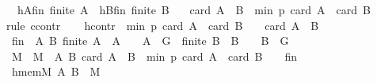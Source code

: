 \begin{isabellebody}
\ \ hAfin{\isacharcolon}{\kern0pt}\ {\isachardoublequoteopen}finite\ A{\isachardoublequoteclose}\ \ hBfin{\isacharcolon}{\kern0pt}\ {\isachardoublequoteopen}finite\ B{\isachardoublequoteclose}\isanewline
\ \ \ {\isachardoublequoteopen}card\ {\isacharparenleft}{\kern0pt}A\ {\isasymcdots}\ B{\isacharparenright}{\kern0pt}\ {\isasymge}\ min\ p\ {\isacharparenleft}{\kern0pt}card\ A\ {\isacharplus}{\kern0pt}\ card\ B\ {\isacharminus}{\kern0pt}\ {}{\isacharparenright}{\kern0pt}{\isachardoublequoteclose}\isanewline
%
\isadelimproof
%
\endisadelimproof
%
\isatagproof
{}\isamarkupfalse%
{\isacharparenleft}{\kern0pt}rule\ ccontr{\isacharparenright}{\kern0pt}\isanewline
\ \ \isamarkupfalse%
\ hcontr{\isacharcolon}{\kern0pt}\ {\isachardoublequoteopen}{\isasymnot}\ min\ p\ {\isacharparenleft}{\kern0pt}card\ A\ {\isacharplus}{\kern0pt}\ card\ B\ {\isacharminus}{\kern0pt}\ {}{\isacharparenright}{\kern0pt}\ {\isasymle}\ card\ {\isacharparenleft}{\kern0pt}A\ {\isasymcdots}\ B{\isacharparenright}{\kern0pt}{\isachardoublequoteclose}\isanewline
\ \ \isamarkupfalse%
\ {\isacharquery}{\kern0pt}fin\ {\isacharequal}{\kern0pt}\ {\isachardoublequoteopen}{\isacharbraceleft}{\kern0pt}{\isacharparenleft}{\kern0pt}A{\isacharcomma}{\kern0pt}\ B{\isacharparenright}{\kern0pt}{\isachardot}{\kern0pt}\ finite\ A\ {\isasymand}\ A\ {\isasymnoteq}\ {\isacharbraceleft}{\kern0pt}{\isacharbraceright}{\kern0pt}\ {\isasymand}\ A\ {\isasymsubseteq}\ G\ {\isasymand}\ finite\ B\ {\isasymand}\ B\ {\isasymnoteq}\ {\isacharbraceleft}{\kern0pt}{\isacharbraceright}{\kern0pt}\ {\isasymand}\ B\ {\isasymsubseteq}\ G{\isacharbraceright}{\kern0pt}{\isachardoublequoteclose}\isanewline
\ \ \isamarkupfalse%
\ M\ \ {\isachardoublequoteopen}M\ {\isacharequal}{\kern0pt}\ {\isacharbraceleft}{\kern0pt}{\isacharparenleft}{\kern0pt}A{\isacharcomma}{\kern0pt}\ B{\isacharparenright}{\kern0pt}{\isachardot}{\kern0pt}\ card\ {\isacharparenleft}{\kern0pt}A\ {\isasymcdots}\ B{\isacharparenright}{\kern0pt}\ {\isacharless}{\kern0pt}\ min\ p\ {\isacharparenleft}{\kern0pt}card\ A\ {\isacharplus}{\kern0pt}\ card\ B\ {\isacharminus}{\kern0pt}\ {}{\isacharparenright}{\kern0pt}{\isacharbraceright}{\kern0pt}\ {\isasyminter}\ {\isacharquery}{\kern0pt}fin{\isachardoublequoteclose}\ \isanewline
\ \ \isamarkupfalse%
\ hmemM{\isacharcolon}{\kern0pt}\ {\isachardoublequoteopen}{\isacharparenleft}{\kern0pt}A{\isacharcomma}{\kern0pt}\ B{\isacharparenright}{\kern0pt}\ {\isasymin}\ M{\isachardoublequoteclose}\ \isamarkupfalse%

\end{isabellebody}
